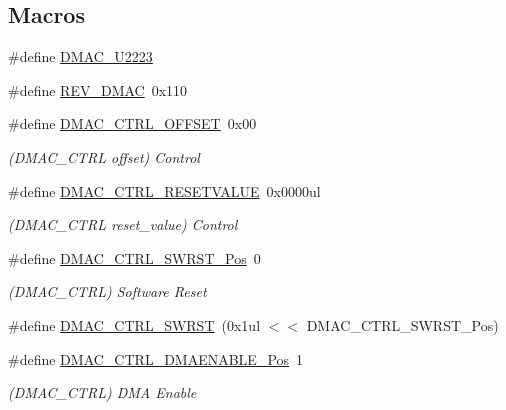 \subsection*{Macros}
\begin{DoxyCompactItemize}
\item 
\#define \mbox{\hyperlink{group___s_a_m_d21___d_m_a_c_gaa984c4145bf19e51a88ef9b4bb4f7996}{D\+M\+A\+C\+\_\+\+U2223}}
\item 
\#define \mbox{\hyperlink{group___s_a_m_d21___d_m_a_c_ga5b6a1637f9f2c1b3d7ab9895b7ee6278}{R\+E\+V\+\_\+\+D\+M\+AC}}~0x110
\item 
\#define \mbox{\hyperlink{group___s_a_m_d21___d_m_a_c_ga645827d59af58171089d84fbbddb7839}{D\+M\+A\+C\+\_\+\+C\+T\+R\+L\+\_\+\+O\+F\+F\+S\+ET}}~0x00
\begin{DoxyCompactList}\small\item\em (D\+M\+A\+C\+\_\+\+C\+T\+RL offset) Control \end{DoxyCompactList}\item 
\#define \mbox{\hyperlink{group___s_a_m_d21___d_m_a_c_gaa0ef8b3b171e00651cfe40f4884ef7fc}{D\+M\+A\+C\+\_\+\+C\+T\+R\+L\+\_\+\+R\+E\+S\+E\+T\+V\+A\+L\+UE}}~0x0000ul
\begin{DoxyCompactList}\small\item\em (D\+M\+A\+C\+\_\+\+C\+T\+RL reset\+\_\+value) Control \end{DoxyCompactList}\item 
\#define \mbox{\hyperlink{group___s_a_m_d21___d_m_a_c_gafc4408f37ef2a70d53e3e1794ab1b422}{D\+M\+A\+C\+\_\+\+C\+T\+R\+L\+\_\+\+S\+W\+R\+S\+T\+\_\+\+Pos}}~0
\begin{DoxyCompactList}\small\item\em (D\+M\+A\+C\+\_\+\+C\+T\+RL) Software Reset \end{DoxyCompactList}\item 
\#define \mbox{\hyperlink{group___s_a_m_d21___d_m_a_c_ga94ac959fd87d0854a52c6ff1f6e2ec19}{D\+M\+A\+C\+\_\+\+C\+T\+R\+L\+\_\+\+S\+W\+R\+ST}}~(0x1ul $<$$<$ D\+M\+A\+C\+\_\+\+C\+T\+R\+L\+\_\+\+S\+W\+R\+S\+T\+\_\+\+Pos)
\item 
\#define \mbox{\hyperlink{group___s_a_m_d21___d_m_a_c_ga16a147fe26766c00dc2d933d0681d7ef}{D\+M\+A\+C\+\_\+\+C\+T\+R\+L\+\_\+\+D\+M\+A\+E\+N\+A\+B\+L\+E\+\_\+\+Pos}}~1
\begin{DoxyCompactList}\small\item\em (D\+M\+A\+C\+\_\+\+C\+T\+RL) D\+MA Enable \end{DoxyCompactList}\item 
$$
\end{DoxyCompactItemize}
